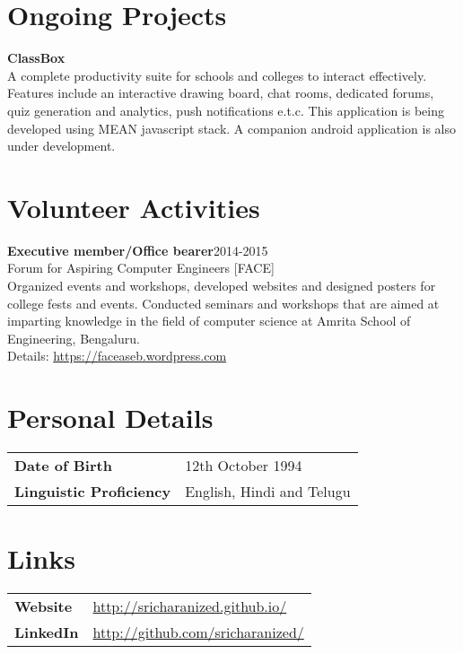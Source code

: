 \documentclass[margin]{res}
\begin{document}
\begin{resume}
 \section{Ongoing Projects}
{\bf ClassBox} \\ A complete productivity suite for schools and colleges to interact effectively. Features include an interactive drawing board, chat rooms, dedicated forums, quiz generation and analytics, push notifications e.t.c. This application is being developed using MEAN javascript stack. A companion android application is also under development.


\section{Volunteer  Activities} 
{\bf Executive member/Office bearer}\hfill  2014-2015\\ Forum for Aspiring Computer Engineers [FACE] \\Organized events and workshops, developed websites and designed posters for college fests and events. Conducted seminars and workshops that are aimed at imparting knowledge in the field of computer science at Amrita School of Engineering, Bengaluru. \\ Details: \underline{https://faceaseb.wordpress.com}
                

\section{Personal Details}
\begin{tabular}{l p{3.5in}}
      \bf{Date of Birth} & \hfill 12th October 1994\\
			\bf{Linguistic Proficiency} & \hfill  English, Hindi and Telugu\\
 \end{tabular}
\section{Links}
\begin{tabular}{l p{3.5in}}
      \bf{Website} & \hfill \underline{http://sricharanized.github.io/}\\
			\bf{LinkedIn} & \hfill  \underline{http://github.com/sricharanized/}\\
 \end{tabular}


\end{resume}
\end{document}
